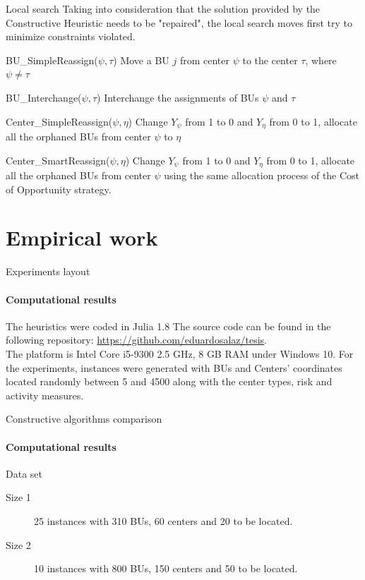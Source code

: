 \documentclass{beamer}
\begin{document}
\begin{frame}{Local search}
    \scriptsize Taking into consideration that the solution provided by the Constructive Heuristic needs to be "repaired", the local search moves first try to minimize constraints violated.
        \begin{block}{BU\_SimpleReassign($\psi, \tau$)}
        \centering
         \footnotesize Move a BU $j$ from center $\psi$ to the center $\tau$, where $\psi \ne \tau$
    \end{block}
    \begin{block}{BU\_Interchange($\psi, \tau$)}
        \centering \footnotesize
        Interchange the assignments of BUs $\psi$ and $\tau$
    \end{block}
    \begin{block}{Center\_SimpleReassign($\psi, \eta$)}
        \centering \footnotesize
        Change $Y_\psi$ from 1 to 0 and $Y_\eta$ from 0 to 1, allocate all the orphaned BUs from center $\psi$ to $\eta$ 
    \end{block}
    \begin{block}{Center\_SmartReassign($\psi, \eta$)}
        \centering \footnotesize
        Change $Y_\psi$ from 1 to 0 and $Y_\eta$ from 0 to 1, allocate all the orphaned BUs from center $\psi$ using the same allocation process of the Cost of Opportunity strategy.
    \end{block}
    
\end{frame}

\section{Empirical work}

\begin{frame}{Experiments layout}
    \framesubtitle{Computational results}
    The heuristics were coded in Julia 1.8
    The source code can be found in the following repository: \url{https://github.com/eduardosalaz/tesis}.\\
    The platform is Intel Core i5-9300 2.5 GHz, 8 GB RAM under Windows 10.
    For the experiments, instances were generated with BUs and Centers' coordinates located randomly between 5 and 4500 along with the center types, risk and activity measures.
\end{frame}

\begin{frame}{Constructive algorithms comparison}
    \framesubtitle{Computational results}

    \begin{block}{Data set}
        \begin{description}
            \item[Size 1] 25 instances with 310 BUs, 60 centers and 20 to be located.
            \item[Size 2] 10 instances with 800 BUs, 150 centers and 50 to be located.
        \end{description}
    \end{block}
\end{frame}
\end{document}
